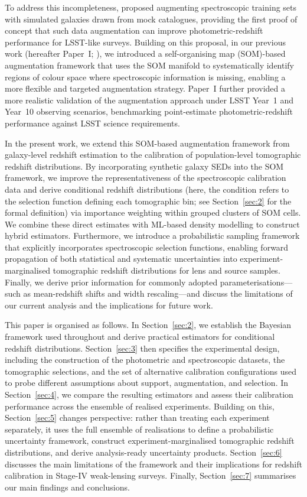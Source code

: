 To address this incompleteness, \citet{2024ApJ...967L...6M} proposed augmenting spectroscopic training sets with simulated galaxies drawn from mock catalogues, providing the first proof of concept that such data augmentation can improve photometric-redshift performance for LSST-like surveys. Building on this proposal, in our previous work (hereafter Paper~I; \citealt{2026MNRAS.547f2226Z}), we introduced a self-organising map (SOM)-based augmentation framework that uses the SOM manifold to systematically identify regions of colour space where spectroscopic information is missing, enabling a more flexible and targeted augmentation strategy. Paper~I further provided a more realistic validation of the augmentation approach under LSST Year~1 and Year~10 observing scenarios, benchmarking point-estimate photometric-redshift performance against LSST science requirements. 

In the present work, we extend this SOM-based augmentation framework from galaxy-level redshift estimation to the calibration of population-level tomographic redshift distributions. By incorporating synthetic galaxy SEDs into the SOM framework, we improve the representativeness of the spectroscopic calibration data and derive conditional redshift distributions (here, the condition refers to the selection function defining each tomographic bin; see Section~\ref{sec:2} for the formal definition) via importance weighting within grouped clusters of SOM cells. We combine these direct estimates with ML-based density modelling to construct hybrid estimators. Furthermore, we introduce a probabilistic sampling framework that explicitly incorporates spectroscopic selection functions, enabling forward propagation of both statistical and systematic uncertainties into experiment-marginalised tomographic redshift distributions for lens and source samples. Finally, we derive prior information for commonly adopted parameterisations---such as mean-redshift shifts and width rescaling---and discuss the limitations of our current analysis and the implications for future work.

This paper is organised as follows. In Section~\ref{sec:2}, we establish the Bayesian framework used throughout and derive practical estimators for conditional redshift distributions. Section~\ref{sec:3} then specifies the experimental design, including the construction of the photometric and spectroscopic datasets, the tomographic selections, and the set of alternative calibration configurations used to probe different assumptions about support, augmentation, and selection. In Section~\ref{sec:4}, we compare the resulting estimators and assess their calibration performance across the ensemble of realised experiments. Building on this, Section~\ref{sec:5} changes perspective: rather than treating each experiment separately, it uses the full ensemble of realisations to define a probabilistic uncertainty framework, construct experiment-marginalised tomographic redshift distributions, and derive analysis-ready uncertainty products. Section~\ref{sec:6} discusses the main limitations of the framework and their implications for redshift calibration in Stage-IV weak-lensing surveys. Finally, Section~\ref{sec:7} summarises our main findings and conclusions.